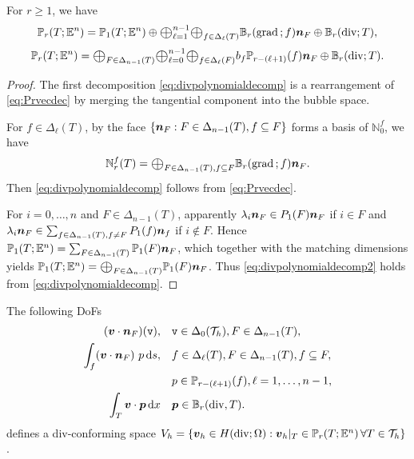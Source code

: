 \documentclass[10pt]{amsart}
\newcommand{\Oplus}{\ensuremath{\vcenter{\hbox{\scalebox{1.5}{$\oplus$}}}}}
\begin{document}
\begin{lemma}
For $r\geq 1$, we have
\begin{equation}\label{eq:divpolynomialdecomp}
\mathbb P_r(T; \mathbb E^n) = \mathbb P_1(T; \mathbb E^n) \oplus \Oplus_{\ell=1}^{n-1}\Oplus_{f\in\Delta_{\ell}(T)}\mathbb B_{r}(\grad; f)\bs n_F\oplus \mathbb B_r(\div; T),
\end{equation}
\begin{equation}\label{eq:divpolynomialdecomp2}
\mathbb P_r(T; \mathbb E^n) = \Oplus_{F\in\Delta_{n-1}(T)} \Oplus_{\ell = 0}^{n-1} \Oplus_{f\in \Delta_{\ell}(F)}b_f\mathbb P_{r-(\ell + 1)}(f)\bs n_F\oplus \mathbb B_r(\div; T).
\end{equation}
\end{lemma}
\begin{proof}
The first decomposition \eqref{eq:divpolynomialdecomp} is a rearrangement of \eqref{eq:Prvecdec} by merging the tangential component into the bubble space. 

For $f\in\Delta_{\ell}(T)$, by the face $\{\boldsymbol n_{F}: F\in \Delta_{n-1}(T), f\subseteq F\}$ forms a basis of $\mathbb N^f_0$,  we have
$$
\mathbb{N}^f_r(T)=\Oplus_{F\in \Delta_{n-1}(T), f\subseteq F}\mathbb B_{r}(\grad; f)\bs n_F.
$$
Then \eqref{eq:divpolynomialdecomp} follows from \eqref{eq:Prvecdec}.

For $i=0,\ldots, n$ and $F\in\Delta_{n-1}(T)$, apparently $\lambda_i\boldsymbol n_F\in P_1(F)\boldsymbol n_F$ if $i\in F$ and  $\lambda_i\boldsymbol n_F\in \sum_{f\in\Delta_{n-1}(T), f\neq F}P_1(f)\boldsymbol n_f$ if $i\not\in F$. Hence $\mathbb P_1(T; \mathbb E^n)=\sum_{F\in\Delta_{n-1}(T)}\mathbb P_1(F)\boldsymbol n_F$, which together with the matching dimensions yields $\mathbb P_1(T; \mathbb E^n)=\Oplus_{F\in\Delta_{n-1}(T)}\mathbb P_1(F)\bs n_F$.
Thus \eqref{eq:divpolynomialdecomp2} holds from \eqref{eq:divpolynomialdecomp}.
\end{proof}



\begin{lemma}\label{lm:bdm}
The following {\rm DoFs}
\begin{align}
\label{eq:divbdDoF0}
(\boldsymbol v\cdot \boldsymbol n_F)(\texttt{v}), &\quad  \texttt{v}\in \Delta_{0}(\mathcal T_h), F\in \Delta_{n-1}(T),\\
\label{eq:divbdDoF}
\int_f (\boldsymbol v\cdot \boldsymbol n_F)\ p \,{\rm d} s, &\quad  f\in \Delta_{\ell}(T), F\in \Delta_{n-1}(T), f\subseteq F, \\
& \quad p\in \mathbb P_{r - (\ell +1)} (f), \ell = 1,\ldots, n-1, \notag\\
\int_T \boldsymbol v \cdot \boldsymbol p \,{\rm d}x&\quad \boldsymbol p\in \mathbb B_r(\operatorname{div}, T). \label{eq:divbubbleDoF}
\end{align}
defines a div-conforming space $V_h=\{\boldsymbol v_h\in H(\operatorname{div}; \Omega): \boldsymbol v_h|_T\in\mathbb P_r(T; \mathbb E^n) \, \forall T\in\mathcal T_h\}$.
\end{lemma}
\end{document}
